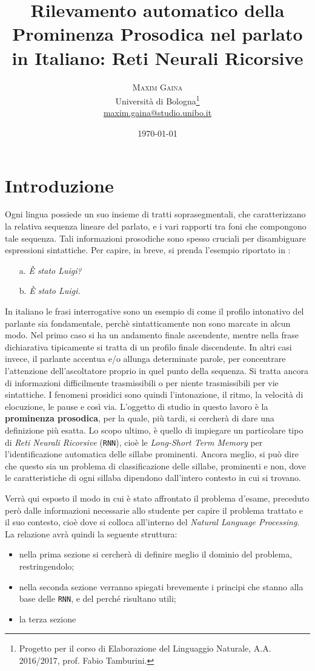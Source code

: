 \documentclass[twoside,twocolumn,11pt]{extarticle}
\title{Rilevamento automatico della Prominenza Prosodica nel parlato in Italiano: Reti Neurali Ricorsive} %
\author{%
\textsc{Maxim Gaina} \\[1ex] %
\normalsize Università di Bologna\thanks{Progetto per il corso di Elaborazione del Linguaggio Naturale, A.A. 2016/2017, prof. Fabio Tamburini.} \\ %
\normalsize \href{mailto:maxim.gaina@studio.unibo.it}{maxim.gaina@studio.unibo.it}
}
\date{\today} %
\theoremstyle{definition}
\begin{document}
\maketitle

\tableofcontents

\section*{Introduzione}
	\lettrine[nindent = 0.4em,lines=3]{O}\space\MakeTextLowercase{g}ni lingua possiede un suo insieme di tratti soprasegmentali, che caratterizzano la relativa sequenza lineare del parlato, e i vari rapporti tra foni che compongono tale sequenza. Tali informazioni prosodiche sono spesso cruciali per disambiguare espressioni sintattiche. Per capire, in breve, si prenda l'esempio riportato in \cite{bib:fenomeni-prosodici-prominenza}:
	\begin{itemize}
		\item[a.] \textit{È stato Luigi?}
		\item[b.] \textit{È stato Luigi.}
	\end{itemize}

	In italiano le frasi interrogative sono un esempio di come il profilo intonativo del parlante sia fondamentale, perchè sintatticamente non sono marcate in alcun modo. Nel primo caso si ha un andamento finale ascendente, mentre nella frase dichiarativa tipicamente si tratta di un profilo finale discendente. In altri casi invece, il parlante accentua e/o allunga determinate parole, per concentrare l'attenzione dell'ascoltatore proprio in quel punto della sequenza.	 Si tratta ancora di informazioni difficilmente trasmissibili o per niente trasmissibili per vie sintattiche. I fenomeni prosidici sono quindi l'intonazione, il ritmo, la velocità di elocuzione, le pause e così via. L'oggetto di studio in questo lavoro è la \textbf{prominenza prosodica}, per la quale, più tardi, si cercherà di dare una definizione più esatta. Lo scopo ultimo, è quello di impiegare un particolare tipo di \textit{Reti Neurali Ricorsive} (\texttt{RNN}), cioè le \textit{Long-Short Term Memory} per l'identificazione automatica delle sillabe prominenti. Ancora meglio, si può dire che questo sia un problema di classificazione delle sillabe, prominenti e non, dove le caratteristiche di ogni sillaba dipendono dall'intero contesto in cui si trovano.
	
	Verrà qui esposto il modo in cui è stato affrontato il problema d'esame, preceduto però dalle informazioni necessarie allo studente per capire il problema trattato e il suo contesto, cioè dove si colloca all'interno del \textit{Natural Language Processing}. La relazione avrà quindi la seguente struttura:
	\begin{itemize}
		\item nella prima sezione si cercherà di definire meglio il dominio del problema, restringendolo;
		\item nella seconda sezione verranno spiegati brevemente i principi che stanno alla base delle \texttt{RNN}, e del perché risultano utili;
		\item la terza sezione
	\end{itemize}
	
\end{document}
